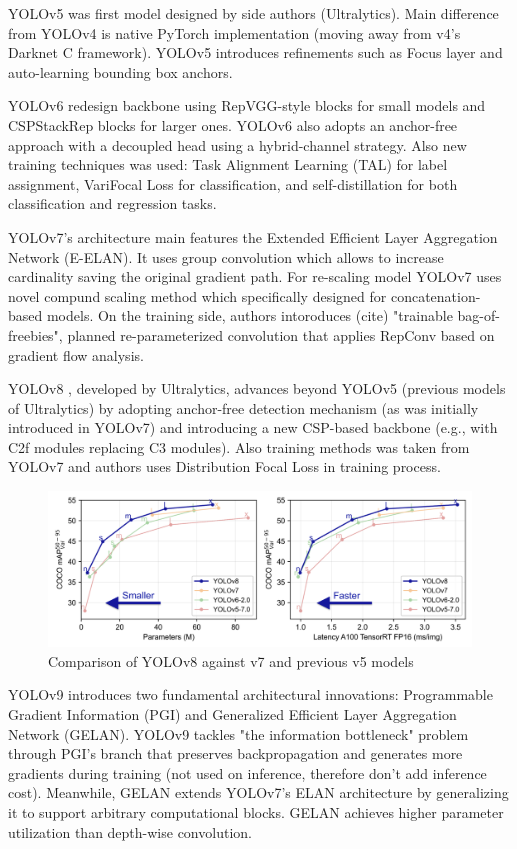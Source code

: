 \documentclass[12pt, a4paper]{article}
\begin{document}
YOLOv5 \cite{yolov5} was first model designed by side authors (Ultralytics). Main difference from YOLOv4 is native PyTorch implementation (moving away from v4’s Darknet C framework). YOLOv5 introduces refinements such as Focus layer and auto-learning bounding box anchors. 

YOLOv6 \cite{yolov6} redesign backbone using RepVGG-style blocks for small models and CSPStackRep blocks for larger ones. YOLOv6 also adopts an anchor-free approach with a decoupled head using a hybrid-channel strategy. Also new training techniques was used: Task Alignment Learning (TAL) for label assignment, VariFocal Loss for classification, and self-distillation for both classification and regression tasks. 

YOLOv7's \cite{yolov7} architecture main features the Extended Efficient Layer Aggregation Network (E-ELAN). It uses group convolution which allows to increase cardinality saving the original gradient path. For re-scaling model YOLOv7 uses novel compund scaling method which specifically designed for concatenation-based models. On the training side, authors intoroduces (cite) "trainable bag-of-freebies", planned re-parameterized convolution that applies RepConv based on gradient flow analysis. 

YOLOv8 \cite{yolov8}, developed by Ultralytics, advances beyond YOLOv5 (previous models of Ultralytics) by adopting anchor-free detection mechanism (as was initially introduced in YOLOv7) and introducing a new CSP-based backbone (e.g., with C2f modules replacing C3 modules). Also training methods was taken from YOLOv7 and authors uses Distribution Focal Loss in training process.

\begin{figure}[h]
    \centering
    \includegraphics[width=0.95\linewidth]{pictures/yolov8.png}
    \caption{Comparison of YOLOv8 against v7 and previous v5 models}
    \label{fig:yolov8}
\end{figure}

YOLOv9 \cite{yolov9} introduces two fundamental architectural innovations: Programmable Gradient Information (PGI) and Generalized Efficient Layer Aggregation Network (GELAN). YOLOv9 tackles "the information bottleneck" problem through PGI's branch that preserves backpropagation and generates more gradients during training (not used on inference, therefore don't add inference cost). Meanwhile, GELAN extends YOLOv7's ELAN architecture by generalizing it to support arbitrary computational blocks. GELAN achieves higher parameter utilization than depth-wise convolution. 
\end{document}
